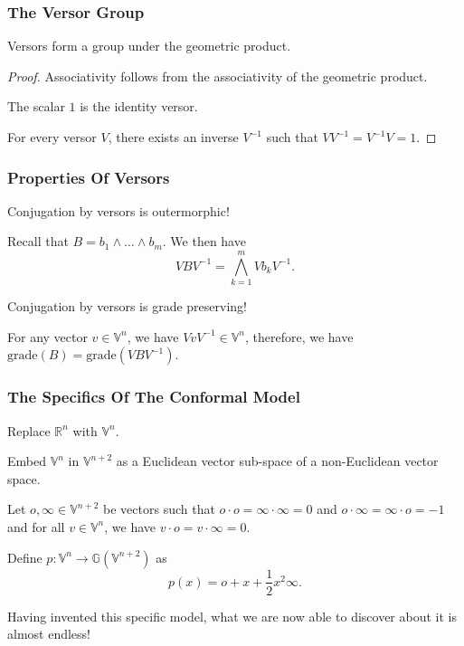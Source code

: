 \documentclass{beamer}
\newcommand{\G}{\mathbb{G}}
\newcommand{\V}{\mathbb{V}}
\newcommand{\R}{\mathbb{R}}
\newcommand{\nvao}{o}
\newcommand{\nvai}{\infty}
\newcommand{\grade}{\mbox{grade}}
\begin{document}
\begin{frame}
\frametitle{The Versor Group}
Versors form a group under the geometric product.\pause
\begin{proof}
\alert{Associativity} follows from the associativity of the geometric product.

The scalar $1$ is the \alert{identity} versor.

For every versor $V$, there exists an \alert{inverse} $V^{-1}$ such that $VV^{-1}=V^{-1}V=1$.
\end{proof}
\end{frame}

\begin{frame}
\frametitle{Properties Of Versors}
Conjugation by versors is \alert{outermorphic}!\pause

Recall that $B=b_1\wedge\dots\wedge b_m$.
We then have
\begin{equation*}
VBV^{-1} = \bigwedge_{k=1}^m Vb_kV^{-1}.
\end{equation*}\pause

Conjugation by versors is \alert{grade preserving}!\pause

For any vector $v\in\V^n$, we have $VvV^{-1}\in\V^n$,
therefore, we have $\grade(B)=\grade(VBV^{-1})$.

\end{frame}

\begin{frame}
\frametitle{The Specifics Of The Conformal Model}
Replace $\R^n$ with $\V^n$.\pause

Embed $\V^n$ in $\V^{n+2}$ as a \alert{Euclidean} vector sub-space of a \alert{non-Euclidean} vector space.\pause

Let $\nvao,\nvai\in\V^{n+2}$ be vectors such that $\nvao\cdot\nvao=\nvai\cdot\nvai=0$
and $\nvao\cdot\nvai=\nvai\cdot\nvao=-1$ and for all $v\in\V^n$, we have $v\cdot\nvao=v\cdot\nvai=0$.\pause

\begin{definition}
Define $p:\V^n\to\G(\V^{n+2})$ as
\begin{equation*}
p(x) = \nvao + x + \frac{1}{2}x^2\nvai.
\end{equation*}
\end{definition}\pause
Having \alert{invented} this specific model, what we are now able to \alert{discover} about it is almost endless!
\end{frame}
\end{document}
